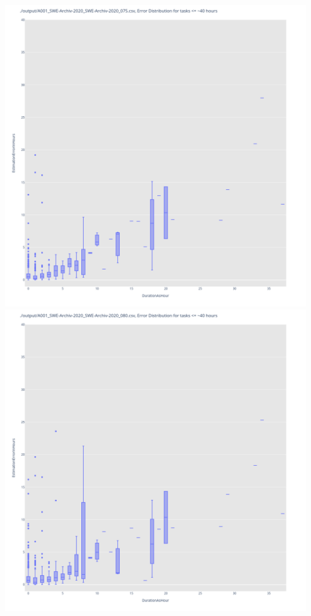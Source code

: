 \includegraphics[width=\textwidth]{Scripts/output/A001_SWE-Archiv-2020_SWE-Archiv-2020_075.csv.error_distribution.png}
\includegraphics[width=\textwidth]{Scripts/output/A001_SWE-Archiv-2020_SWE-Archiv-2020_080.csv.error_distribution.png}
